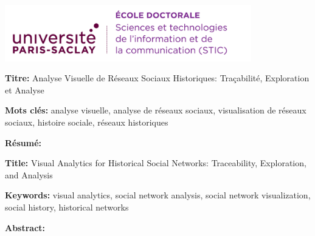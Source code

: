 \documentclass[12pt,a4paper, twoside, headings=small]{book}
\begin{document}
    \lhead{}
    \rhead{}
    \rfoot{}
    \cfoot{}
    \lfoot{}

    \noindent
    \includegraphics[height=2.45cm]{static/logos/logo_usp_STIC}
    \vspace{1cm}
    \selectfont

    \small

    \begin{mdframed}[linecolor=Prune,linewidth=1]

        \textbf{Titre:} Analyse Visuelle de Réseaux Sociaux Historiques: Traçabilité, Exploration et Analyse

        \noindent \textbf{Mots clés:} analyse visuelle, analyse de réseaux sociaux, visualisation de réseaux sociaux, histoire sociale, réseaux historiques

        \vspace{-.5cm}
        \begin{multicols}{2}
            \noindent \textbf{Résumé:} \abstractfrnew
        \end{multicols}

    \end{mdframed}

    \vspace{8mm}

    \begin{mdframed}[linecolor=Prune,linewidth=1]

        \textbf{Title:} Visual Analytics for Historical Social Networks: Traceability, Exploration, and Analysis

        \noindent \textbf{Keywords:} visual analytics, social network analysis, social network visualization, social history, historical networks

        \begin{multicols}{2}
            \noindent \textbf{Abstract:} \abstractengnew
        \end{multicols}
    \end{mdframed}
\end{document}
